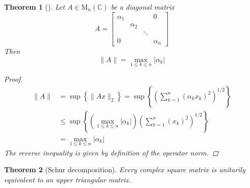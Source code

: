 \documentclass[letterpaper, 10pt]{article}
\theoremstyle{theostyle}
\newtheorem{theorem}{Theorem}[section]
\newenvironment{thmstyle}[1][]{%
    \begin{theorem}[#1]\leavevmode\vspace{-\baselineskip}\myquote%
    }{\endmyquote\end{theorem}}
\begin{document}
\begin{thmstyle}
    Let \(A \in \mathrm{M}_n (\mathbb{C})\) be a diagonal matrix
    \[A = 
        \begin{bmatrix}
            \alpha_1 & & & 0 \\
            & \alpha_2 & & \\
            & & \ddots & \\
            0 & & & \alpha_n
        \end{bmatrix}
    \]
    Then
    \[\lVert A \rVert = \max_{1 \leq k \leq n} \lvert \alpha_k \rvert\]

    \begin{proof}
        \begin{align*}
            \lVert A \rVert &= \sup \left\{\lVert A x \rVert_2 \right\} = \sup \left\{\left(\sum_{k=1}^n \left(\alpha_k x_k\right)^2\right)^{1/2} \right\} \\
            &\leq \sup \left\{ \left(\max_{1 \leq k \leq n} \lvert \alpha_k \rvert \right) \left(\sum_{k=1}^n \left( x_k\right)^2\right)^{1/2} \right\} \\
            &= \max_{1 \leq k \leq n} \lvert \alpha_k \rvert
        \end{align*}
        The reverse inequality is given by definition of the operator norm.
    \end{proof}
\end{thmstyle}


\begin{thmstyle}[Schur decomposition]
    Every complex square matrix is unitarily equivalent to an upper triangular matrix.
\end{thmstyle}
\end{document}
